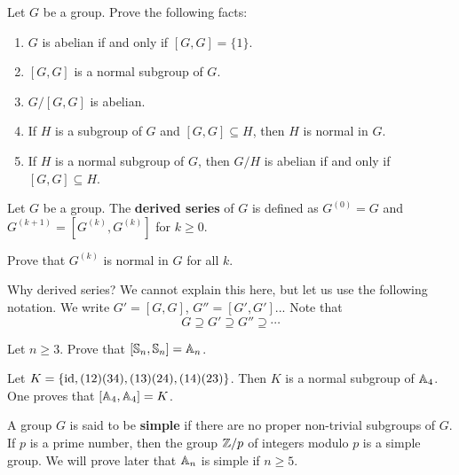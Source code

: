 \begin{exercise}
    Let $G$ be a group. 
    Prove the following facts:
    \begin{enumerate}
        \item $G$ is abelian if and only if $[G,G]=\{1\}$.
        \item $[G,G]$ is a normal subgroup of $G$. 
        \item $G/[G,G]$ is abelian. 
        \item If $H$ is a subgroup of $G$ and $[G,G]\subseteq H$, then 
        $H$ is normal in $G$.
        \item If $H$ is a normal subgroup of $G$, then 
        $G/H$ is abelian if and only if $[G,G]\subseteq H$. 
    \end{enumerate}
\end{exercise}

\begin{definition}
    Let $G$ be a group. The \textbf{derived series} of $G$ 
    is defined as $G^{(0)}=G$ and
    $G^{(k+1)}=[G^{(k)},G^{(k)}]$ for $k\geq 0$. 
\end{definition}

\begin{exercise}
    Prove that $G^{(k)}$ is normal in $G$ for all $k$. 
\end{exercise}

Why derived series? We cannot explain this here, but let us use the following
notation. 
We write $G'=[G,G]$, $G''=[G',G']$... 
Note that 
\[
G\supseteq G'\supseteq G''\supseteq\cdots
\]


\begin{exercise}
    Let $n\geq3$. Prove that 
    $[\mathbb{S}_n,\mathbb{S}_n]=\mathbb{A}_n$. 
\end{exercise}

\begin{example}
    Let $K=\{\operatorname{id},(12)(34),(13)(24),(14)(23)\}$. Then 
    $K$ is a normal subgroup of $\mathbb{A}_4$. 
    One proves that $[\mathbb{A}_4,\mathbb{A}_4]=K$. 
\end{example}

A group $G$ is said to be \textbf{simple} 
if there are no proper non-trivial subgroups of $G$. If $p$
is a prime number, then the group 
$\mathbb{Z}/p$ of integers modulo $p$ 
is a simple group. We will prove
later that $\mathbb{A}_n$ is simple if 
$n\geq5$. 

